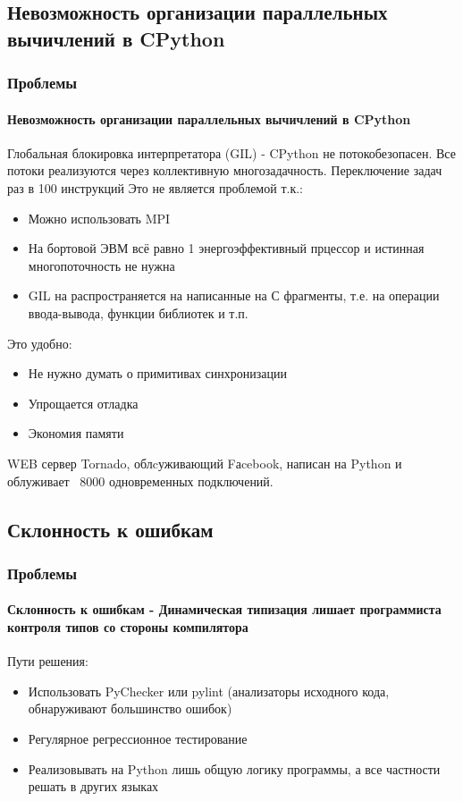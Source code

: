\documentclass{beamer}
\begin{document}
\subsection{Невозможность организации параллельных вычичлений в CPython}
\begin{frame}
\frametitle{Проблемы}
\framesubtitle{Невозможность организации параллельных вычичлений в CPython}
\alert{Глобальная блокировка интерпретатора (GIL)} - CPython не потокобезопасен. Все потоки реализуются через коллективную
многозадачность. Переключение задач раз в 100 инструкций
Это не является проблемой т.к.: 
\begin{itemize}
	\item<1> Можно использовать MPI
	\item<1> На бортовой ЭВМ всё равно 1 энергоэффективный прцессор и истинная многопоточность не нужна
	\item<1> GIL на распространяется на написанные на С фрагменты, т.е. на операции ввода-вывода, функции библиотек и т.п. 
\end{itemize}
Это удобно:
\begin{itemize}
	\item<1> Не нужно думать о примитивах синхронизации
	\item<1> Упрощается отладка
	\item<1> Экономия памяти
\end{itemize}
WEB сервер Tornado, облcуживающий Fаcebook, написан на Python и облуживает ~8000 одновременных подключений.
\end{frame}

\subsection{Склонность к ошибкам}
\begin{frame}
\frametitle{Проблемы}
\framesubtitle{Склонность к ошибкам - Динамическая типизация лишает программиста контроля типов со стороны компилятора}

Пути решения:
\begin{itemize}
	\item<1> Использовать PyChecker или pylint (анализаторы исходного кода, обнаруживают большинство ошибок)
	\item<1> Регулярное регрессионное тестирование
	\item<1> Реализовывать на Python лишь общую логику программы, а все частности решать в других языках
\end{itemize}
\end{frame}
\end{document}
